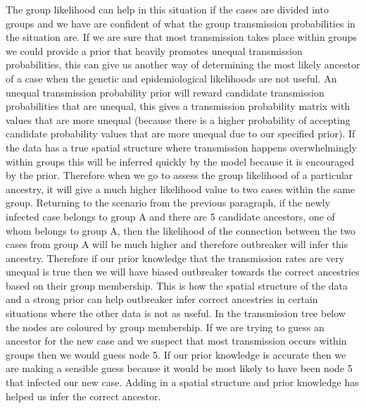 \documentclass[11pt,a4paper]{report}
\begin{document}
The group likelihood can help in this situation if the cases are divided into groups and we have are confident of what the group transmission probabilities in the situation are. If we are sure that most transmission takes place within groups we could provide a prior that heavily promotes unequal transmission probabilities, this can give us another way of determining the most likely ancestor of a case when the genetic and epidemiological likelihoods are not useful.  An unequal transmission probability prior will reward candidate transmission probabilities that are unequal, this gives a transmission probability matrix with values that are more unequal (because there is a higher probability of accepting candidate probability values that are more unequal due to our specified prior). If the data has a true spatial structure where transmission happens overwhelmingly within groups this will be inferred quickly by the model because it is encouraged by the prior. Therefore when we go to assess the group likelihood of a particular ancestry, it will give a much higher likelihood value to two cases within the same group. Returning to the scenario from the previous paragraph, if the newly infected case belongs to group A and there are 5 candidate ancestors, one of whom belongs to group A, then the likelihood of the connection between the two cases from group A will be much higher and therefore outbreaker will infer this ancestry. Therefore if our prior knowledge that the transmission rates are very unequal is true then we will have biased outbreaker towards the correct ancestries based on their group membership. This is how the spatial structure of the data and a strong prior can help outbreaker infer correct ancestries in certain situations where the other data is not as useful. In the transmission tree below the nodes are coloured by group membership. If we are trying to guess an ancestor for the new case and we suspect that most transmission occurs within groups then we would guess node 5. If our prior knowledge is accurate then we are making a sensible guess because it would be most likely to have been node 5 that infected our new case. Adding in a spatial structure and prior knowledge has helped us infer the correct ancestor.
\end{document}
